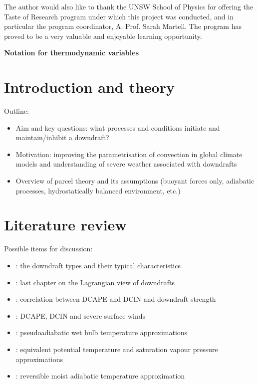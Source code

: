 \documentclass[12pt,titlepage]{article}
\begin{document}
The author would also like to thank the UNSW School of Physics for
offering the Taste of Research program under which this project was
conducted, and in particular the program coordinator, A. Prof. Sarah
Martell. The program has proved to be a very valuable and enjoyable
learning opportunity.

\begin{center}
	\large
	\textbf{Notation for thermodynamic variables}
\end{center}

\tableofcontents

\clearpage
\section{Introduction and theory}
Outline:
\begin{itemize}
	\item Aim and key questions: what processes and conditions initiate
		and maintain/inhibit a downdraft?
	\item Motivation: improving the parametrisation of convection
		in global climate models and understanding of severe weather
		associated with downdrafts
	\item Overview of parcel theory and its assumptions (buoyant forces
		only, adiabatic processes, hydrostatically balanced
		environment, etc.)
\end{itemize}

\section{Literature review}
Possible items for discussion:
\begin{itemize}
	\item \textcite{knupp_cotton_1985}: the downdraft types and their
		typical characteristics
	\item \textcite{thayer-calder_2013}: last chapter on the Lagrangian
		view of downdrafts
	\item \textcite{market_2017}: correlation between DCAPE and DCIN and
		downdraft strength
	\item \textcite{sumrall_2020}: DCAPE, DCIN and severe surface winds
	\item \textcite{davies-jones_2008}: pseudoadiabatic wet bulb
		temperature approximations
	\item \textcite{bolton_1980}: equivalent potential temperature
		and saturation vapour pressure approximations
	\item \textcite{saunders_1957}: reversible moist adiabatic
		temperature approximation
\end{itemize}
\end{document}
